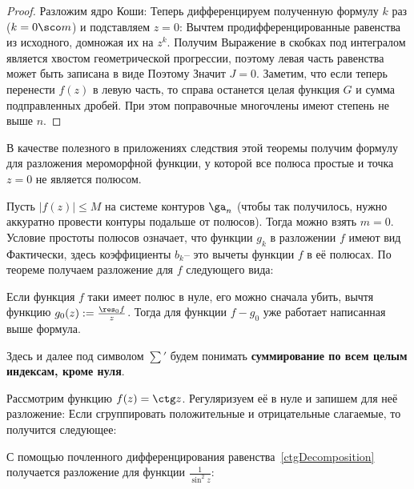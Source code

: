 \documentclass[a4paper]{article}
\def\mcomp#1{\mskip-10mu#1\mskip-10mu}
\begin{document}
\begin{proof}
Разложим ядро Коши:
Теперь дифференцируем полученную формулу $k$ раз ($k = 0\sco m$) и подставляем $z = 0$:
\eqn{\frac1{2\pi i} \ints{\ga_n} \frac{f(\ze)}{\ze^{k+1}}\,d\ze = \frac{f^{(k)}(0)}{k!} -
\mcomp{\sums{a_j\in D_n}} \frac{g^{(k)}_j(0)}{k!}.}
Вычтем продифференцированные равенства из исходного, домножая их на $z^k$. Получим
Выражение в скобках под интегралом является хвостом геометрической прогрессии, поэтому
левая часть равенства может быть записана в виде
Поэтому
Значит $J = 0$. Заметим, что если теперь перенести $f(z)$ в левую часть, то
справа останется целая функция $G$ и сумма подправленных дробей. При этом поправочные
многочлены имеют степень не выше $n$.
\end{proof}

В качестве полезного в приложениях следствия этой теоремы получим формулу для разложения
мероморфной функции, у которой все полюса простые и точка $z=0$ не является полюсом.

Пусть $|f(z)| \le M$ на системе контуров $\ga_n$ (чтобы так получилось, нужно аккуратно
провести контуры подальше от полюсов). Тогда можно взять $m=0$. Условие простоты полюсов
означает, что функции $g_k$ в разложении $f$ имеют вид
Фактически, здесь коэффициенты $b_k$-- это вычеты функции $f$ в её полюсах.
По теореме получаем разложение для $f$ следующего вида:

Если функция $f$ таки имеет полюс в нуле, его можно сначала убить, вычтя функцию
$g_0(z) := \frac{\res_0 f}{z}$. Тогда для функции $f - g_0$ уже работает написанная выше формула.


\smallskip
Здесь и далее под символом $\sum'$ будем понимать \textbf{суммирование по всем целым
индексам, кроме нуля}.

\begin{ex}
Рассмотрим функцию $f(z) = \ctg z$. Регуляризуем её в нуле и запишем для неё разложение:
Если сгруппировать положительные и отрицательные слагаемые, то получится следующее:

С помощью почленного дифференцирования равенства~\eqref{ctgDecomposition} получается разложение
для функции $\frac1{\sin^2z}$:
\end{ex}
\end{document}
